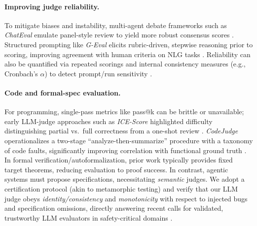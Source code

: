 \documentclass{article}
\begin{document}
\paragraph{Improving judge reliability.}
To mitigate biases and instability, multi-agent debate frameworks such as \emph{ChatEval} emulate panel-style review to yield more robust consensus scores \citep{Chan2024ChatEval}. Structured prompting like \emph{G-Eval} elicits rubric-driven, stepwise reasoning prior to scoring, improving agreement with human criteria on NLG tasks \citep{Liu2023GEval}. Reliability can also be quantified via repeated scorings and internal consistency measures (e.g., Cronbach's $\alpha$) to detect prompt/run sensitivity \citep{Li2024TrustLLMJudgments}.

\paragraph{Code and formal-spec evaluation.}
For programming, single-pass metrics like pass@k can be brittle or unavailable; early LLM-judge approaches such as \emph{ICE-Score} highlighted difficulty distinguishing partial vs.\ full correctness from a one-shot review \citep{Zhuo2024ICEScore}. \emph{CodeJudge} operationalizes a two-stage ``analyze-then-summarize'' procedure with a taxonomy of code faults, significantly improving correlation with functional ground truth \citep{TongZhang2024CodeJudge}. In formal verification/autoformalization, prior work typically provides fixed target theorems, reducing evaluation to proof success. In contrast, agentic systems must propose specifications, necessitating \emph{semantic} judges. We adopt a certification protocol (akin to metamorphic testing) and verify that our LLM judge obeys \emph{identity/consistency} and \emph{monotonicity} with respect to injected bugs and specification omissions, directly answering recent calls for validated, trustworthy LLM evaluators in safety-critical domains \citep{Kocmi2024HumanVsLLM,Li2024TrustLLMJudgments}.
\end{document}
